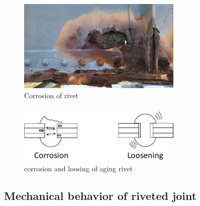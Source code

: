 \begin{figure}[htbp]
    \centering
        \centering
        \includegraphics[width=0.7\textwidth]{imgs/ch2/rivet-cor-1.jpg}%
        \caption{Corrosion of rivet}
        \label{fig-corriv}
    
\end{figure}


\begin{figure}[htbp]
    \centering
    \includegraphics[width=0.7\textwidth]{imgs/ch2/rivet-issue.pdf}
    \caption{corrosion and loosing of aging rivet}
    \label{fig-rivetisu}
\end{figure}

\subsection{Mechanical behavior of riveted joint}

